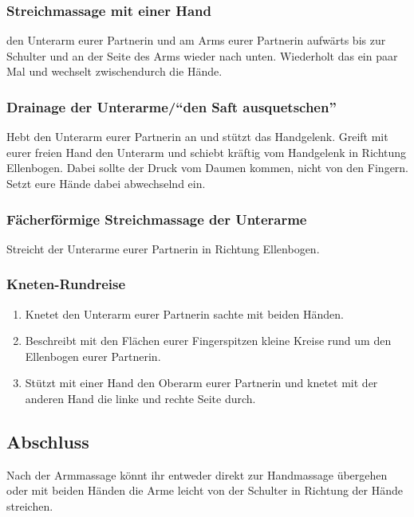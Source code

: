 \subsubsection{Streichmassage mit einer Hand}
 den Unterarm eurer Partnerin und  am Arms eurer Partnerin aufwärts bis zur Schulter und an der Seite des Arms wieder nach unten. Wiederholt das ein paar Mal und wechselt zwischendurch die Hände.

\subsubsection{Drainage der Unterarme/"`den Saft ausquetschen"'}
Hebt den Unterarm eurer Partnerin an und stützt das Handgelenk. Greift mit eurer freien Hand den Unterarm und schiebt kräftig vom Handgelenk in Richtung Ellenbogen. Dabei sollte der Druck vom Daumen kommen, nicht von den Fingern. Setzt eure Hände dabei abwechselnd ein.

\subsubsection{Fächerförmige Streichmassage der Unterarme}
Streicht  der Unterarme eurer Partnerin in Richtung Ellenbogen.

\subsubsection{Kneten-Rundreise}
\begin{oframed}
	\begin{enumerate}
		\item {} Knetet den Unterarm eurer Partnerin sachte mit beiden Händen.
		\item {} Beschreibt mit den Flächen eurer Fingerspitzen kleine Kreise rund um den Ellenbogen eurer Partnerin.
		\item {} Stützt mit einer Hand den Oberarm eurer Partnerin und knetet mit der anderen Hand die linke und rechte Seite durch.
	\end{enumerate}
\end{oframed}

\subsection{Abschluss}
Nach der Armmassage könnt ihr entweder direkt zur Handmassage übergehen oder mit beiden Händen die Arme leicht von der Schulter in Richtung der Hände streichen.
